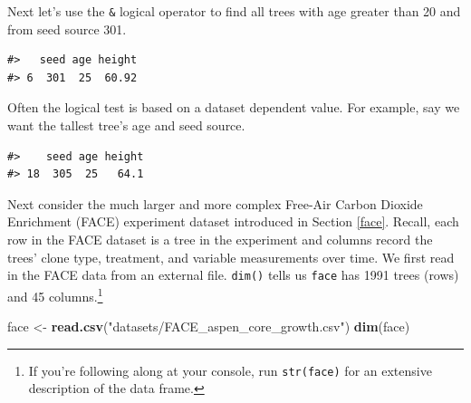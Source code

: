 \documentclass[
  11pt,
]{krantz}
\newenvironment{Shaded}{\begin{snugshade}}{\end{snugshade}}
\newcommand{\DecValTok}[1]{\textcolor[rgb]{0.00,0.00,0.81}{#1}}
\newcommand{\KeywordTok}[1]{\textcolor[rgb]{0.13,0.29,0.53}{\textbf{#1}}}
\newcommand{\NormalTok}[1]{#1}
\newcommand{\OperatorTok}[1]{\textcolor[rgb]{0.81,0.36,0.00}{\textbf{#1}}}
\newcommand{\StringTok}[1]{\textcolor[rgb]{0.31,0.60,0.02}{#1}}
\theoremstyle{definition}
\theoremstyle{definition}
\theoremstyle{definition}
\theoremstyle{definition}
\theoremstyle{remark}
\begin{document}
Next let's use the \texttt{\&} logical operator to find all trees with age greater than 20 and from seed source 301.

\begin{Shaded}
\end{Shaded}

\begin{verbatim}
#>   seed age height
#> 6  301  25  60.92
\end{verbatim}

Often the logical test is based on a dataset dependent value. For example, say we want the tallest tree's age and seed source.

\begin{Shaded}
\end{Shaded}

\begin{verbatim}
#>    seed age height
#> 18  305  25   64.1
\end{verbatim}

Next consider the much larger and more complex Free-Air Carbon Dioxide Enrichment (FACE) experiment dataset introduced in Section \ref{face}. Recall, each row in the FACE dataset is a tree in the experiment and columns record the trees' clone type, treatment, and variable measurements over time. We first read in the FACE data from an external file. \texttt{dim()} tells us \texttt{face} has 1991 trees (rows) and 45 columns.\footnote{If you're following along at your console, run \texttt{str(face)} for an extensive description of the data frame.}

\begin{Shaded}
\begin{Highlighting}[]
\NormalTok{face \textless{}{-}}\StringTok{ }\KeywordTok{read.csv}\NormalTok{(}\StringTok{"datasets/FACE\_aspen\_core\_growth.csv"}\NormalTok{)}
\KeywordTok{dim}\NormalTok{(face)}
\end{Highlighting}
\end{Shaded}
\end{document}
